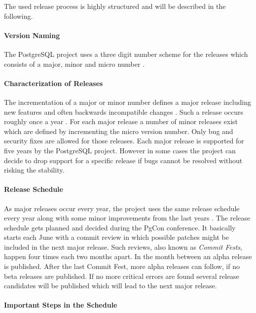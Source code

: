 The used release process is highly structured and will be described in the
following.

\paragraph{Version Naming}

The PostgreSQL project uses a three digit number scheme for the releases which
consists of a major, minor and micro number \cite{PostgreSQLVersioning}.

\paragraph{Characterization of Releases}

The incrementation of a major or minor number defines a major release including
new features and often backwards incompatible changes
\cite{PostgreSQLVersioning}. Such a release occurs roughly once a year
\cite{PostgreSQLDevelopment,PostgreSQLFAQ}. For each major release a number of
minor releases exist which are defined by incrementing the micro version
number. Only bug and security fixes are allowed for those releases. Each major
release is supported for five years by the PostgreSQL project. However in some
cases the project can decide to drop support for a specific release if bugs
cannot be resolved without risking the stability.

\paragraph{Release Schedule}

As major releases occur every year, the project uses the same release schedule
every year along with some minor improvements from the last years
\cite{PostgreSQLDevelopment}. The release schedule gets planned and decided
during the PgCon conference. It basically starts each June with a commit review
in which possible patches might be included in the next major release. Such
reviews, also known as \emph{Commit Fests}, happen four times each two months
apart. In the month between an alpha release is published. After the last
Commit Fest, more alpha releases can follow, if no beta releases are published.
If no more critical errors are found several release candidates will be
published which will lead to the next major release.

\paragraph{Important Steps in the Schedule}

